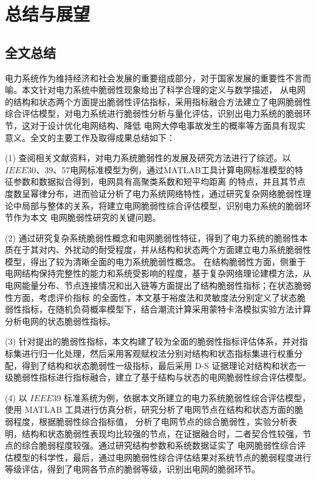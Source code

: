 \chapter{总结与展望}
\label{cha:summery}

\section{全文总结}
\label{sec:sum}
电力系统作为维持经济和社会发展的重要组成部分，对于国家发展的重要性不言而喻。本文针对电力系统中脆弱性现象给出了科学合理的定义与数学描述，
从电网的结构和状态两个方面提出脆弱性评估指标，采用指标融合方法建立了电网脆弱性综合评估模型，对电力系统进行脆弱性分析与量化评估，识别出电力系统的脆弱环节，这对于设计优化电网结构、降低
电网大停电事故发生的概率等方面具有现实意义。全文的主要工作及取得成果总结如下：

(1) 查阅相关文献资料，对电力系统脆弱性的发展及研究方法进行了综述。以$IEEE$30、39、57电网标准模型为例，通过MATLAB工具计算电网标准模型的特征参数和数据拟合得到，电网具有高聚类系数和短平均距离
的特点，并且其节点度数呈幂律分布，进而验证分析了电力系统网络特性，通过研究复杂网络脆弱性理论中局部与整体的关系，将建立电网脆弱性综合评估模型，识别电力系统的脆弱环节作为本文
电网脆弱性研究的关键问题。

(2) 通过研究复杂系统脆弱性概念和电网脆弱性特征，得到了电力系统的脆弱性本质在于其对内、外扰动的耐受程度，并从结构和状态两个方面建立电力系统脆弱性模型，得出了较为清晰全面的电力系统脆弱性概念。
在结构脆弱性方面，侧重于电网结构保持完整性的能力和系统受影响的程度，基于复杂网络理论建模方法，从电网能量分布、节点连接情况和出入链等方面提出了结构脆弱性指标；在状态脆弱性方面，考虑评价指标
的全面性，本文基于裕度法和灵敏度法分别定义了状态脆弱性指标，在随机负荷概率模型下，结合潮流计算采用蒙特卡洛模拟实验方法计算分析电网的状态脆弱性指标。

(3) 针对提出的脆弱性指标，本文构建了较为全面的脆弱性指标评估体系，并对指标集进行归一化处理，然后采用客观赋权法分别对结构和状态指标集进行权重分配，得到了结构和状态脆弱性一级指标，最后采用
 D-S 证据理论对结构和状态一级脆弱性指标进行指标融合，建立了基于结构与状态的电网脆弱性综合评估模型。

(4) 以 $IEEE39$ 标准系统为例，依据本文所建立的电力系统脆弱性综合评估模型，使用 MATLAB 工具进行仿真分析，研究分析了电网节点在结构和状态方面的脆弱程度，根据脆弱性综合指标值，
分析了电网节点的综合脆弱性，实验分析表明，结构和状态脆弱性表现均比较强的节点，在证据融合时，二者契合性较强，节点的综合脆弱程度较强。通过研究结构参数和系统数据证实了
电网脆弱性综合评估模型的科学性，最后，通过电网脆弱性综合评估结果对系统节点的脆弱程度进行等级评估，得到了电网各节点的脆弱等级，识别出电网的脆弱环节。

